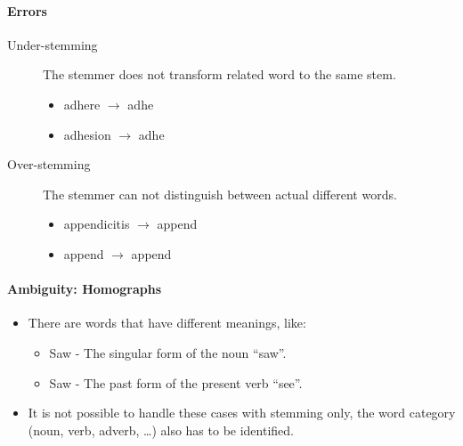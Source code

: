                 \paragraph{Errors} %
                	\begin{description}
                		\item[Under-stemming] The stemmer does not transform related word to the same stem.
                			\begin{itemize}
                				\item adhere \(\rightarrow\) adhe
                				\item adhesion \(\rightarrow\) adhe
                			\end{itemize}
                		\item[Over-stemming] The stemmer can not distinguish between actual different words.
                			\begin{itemize}
                				\item appendicitis \(\rightarrow\) append
                				\item append \(\rightarrow\) append
                			\end{itemize}
                	\end{description}

                \paragraph{Ambiguity: Homographs} %
                    \begin{itemize}
                    	\item There are words that have different meanings, like:
                    		\begin{itemize}
                    			\item Saw - The singular form of the noun \enquote{saw}.
                    			\item Saw - The past form of the present verb \enquote{see}.
                    		\end{itemize}
                    	\item It is not possible to handle these cases with stemming only, the word category (noun, verb, adverb, \dots) also has to be identified.
                    \end{itemize}

